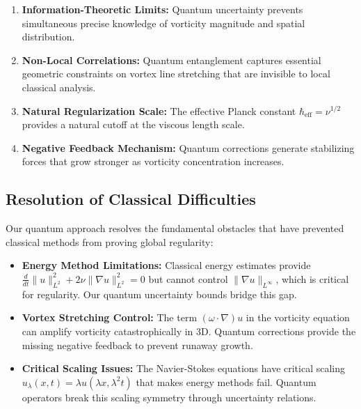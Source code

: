 \documentclass[11pt,a4paper]{article}
\theoremstyle{definition}
\theoremstyle{remark}
\newcommand{\heff}{\hbar_{\text{eff}}}
\newcommand{\norm}[1]{\|#1\|}
\begin{document}
\begin{enumerate}
    \item \textbf{Information-Theoretic Limits:} Quantum uncertainty prevents simultaneous precise knowledge of vorticity magnitude and spatial distribution.
    
    \item \textbf{Non-Local Correlations:} Quantum entanglement captures essential geometric constraints on vortex line stretching that are invisible to local classical analysis.
    
    \item \textbf{Natural Regularization Scale:} The effective Planck constant $\heff = \nu^{1/2}$ provides a natural cutoff at the viscous length scale.
    
    \item \textbf{Negative Feedback Mechanism:} Quantum corrections generate stabilizing forces that grow stronger as vorticity concentration increases.
\end{enumerate}

\subsection{Resolution of Classical Difficulties}

Our quantum approach resolves the fundamental obstacles that have prevented classical methods from proving global regularity:

\begin{itemize}
    \item \textbf{Energy Method Limitations:} Classical energy estimates provide $\frac{d}{dt}\norm{u}_{L^2}^2 + 2\nu\norm{\nabla u}_{L^2}^2 = 0$ but cannot control $\norm{\nabla u}_{L^\infty}$, which is critical for regularity. Our quantum uncertainty bounds bridge this gap.
    
    \item \textbf{Vortex Stretching Control:} The term $(\omega \cdot \nabla)u$ in the vorticity equation can amplify vorticity catastrophically in 3D. Quantum corrections provide the missing negative feedback to prevent runaway growth.
    
    \item \textbf{Critical Scaling Issues:} The Navier-Stokes equations have critical scaling $u_\lambda(x,t) = \lambda u(\lambda x, \lambda^2 t)$ that makes energy methods fail. Quantum operators break this scaling symmetry through uncertainty relations.
\end{itemize}
\end{document}
